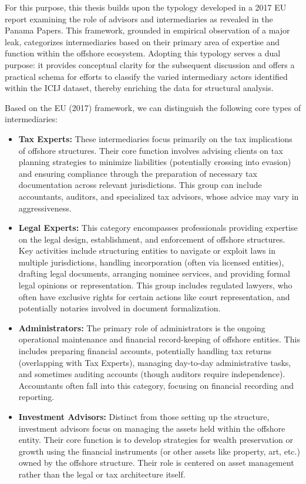For this purpose, this thesis builds upon the typology developed in a 2017 EU report examining the role of advisors and intermediaries as revealed in the Panama Papers. This framework, grounded in empirical observation of a major leak, categorizes intermediaries based on their primary area of expertise and function within the offshore ecosystem. Adopting this typology serves a dual purpose: it provides conceptual clarity for the subsequent discussion and offers a practical schema for efforts to classify the varied intermediary actors identified within the ICIJ dataset, thereby enriching the data for structural analysis.

Based on the EU (2017) framework, we can distinguish the following core types of intermediaries:
\begin{itemize}[leftmargin=*]
    \item \textbf{Tax Experts:} These intermediaries focus primarily on the tax implications of offshore structures. Their core function involves advising clients on tax planning strategies to minimize liabilities (potentially crossing into evasion) and ensuring compliance through the preparation of necessary tax documentation across relevant jurisdictions. This group can include accountants, auditors, and specialized tax advisors, whose advice may vary in aggressiveness.
    
    \item \textbf{Legal Experts:} This category encompasses professionals providing expertise on the legal design, establishment, and enforcement of offshore structures. Key activities include structuring entities to navigate or exploit laws in multiple jurisdictions, handling incorporation (often via licensed entities), drafting legal documents, arranging nominee services, and providing formal legal opinions or representation. This group includes regulated lawyers, who often have exclusive rights for certain actions like court representation, and potentially notaries involved in document formalization.
    
    \item \textbf{Administrators:} The primary role of administrators is the ongoing operational maintenance and financial record-keeping of offshore entities. This includes preparing financial accounts, potentially handling tax returns (overlapping with Tax Experts), managing day-to-day administrative tasks, and sometimes auditing accounts (though auditors require independence). Accountants often fall into this category, focusing on financial recording and reporting.
    
    \item \textbf{Investment Advisors:} Distinct from those setting up the structure, investment advisors focus on managing the assets held within the offshore entity. Their core function is to develop strategies for wealth preservation or growth using the financial instruments (or other assets like property, art, etc.) owned by the offshore structure. Their role is centered on asset management rather than the legal or tax architecture itself.
\end{itemize}
